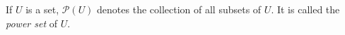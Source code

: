 If $U$ is a set, $\mathcal{P}(U)$ denotes the collection of all subsets of $U$. It is called the \emph{power set} of $U$.
